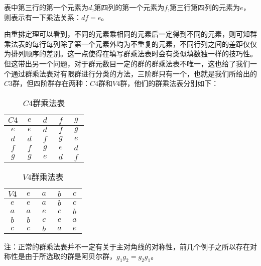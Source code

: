 表中第三行的第一个元素为$d$,第四列的第一个元素为$f$,第三行第四列的元素为$e$，则表示有一下乘法关系：$df=e$。

由重排定理可以看到，不同的元素乘相同的元素后一定得到不同的元素，则可知群乘法表的每行每列除了第一个元素外均为不重复的元素，不同行列之间的差距仅仅为排列顺序的差别。这一点使得在填写群乘法表时会有类似填数独一样的技巧性。但这带出另一个问题，对于群元数目一定的群的群乘法表不唯一，这也给了我们一个通过群乘法表对有限群进行分类的方法，三阶群只有一个，也就是我们所给出的$C3$群，但四阶群存在两种：$C4$群和$V4$群，他们的群乘法表分别如下：

\begin{table}[ht]
\centering
\caption{$C4$群乘法表}\label{groupt_tab2}
\begin{tabular}{|c|c|c|c|c|}
\hline
$C4$ & $~e~$ & $~d~$ & $~f~$ & $~g~$ \\
\hline
$e$ & $e$ & $d$ & $f$ & $g$ \\
\hline
$d$ & $d$ & $f$ & $g$ & $e$ \\
\hline
$f$ & $f$ & $g$ & $e$ & $d$ \\
\hline
$g$ & $g$ & $e$ & $d$ & $f$ \\
\hline
\end{tabular}
\end{table}

\begin{table}[ht]
\centering
\caption{$V4$群乘法表}\label{groupt_tab3}
\begin{tabular}{|c|c|c|c|c|}
\hline
$V4$ & $~e~$ & $~a~$ & $~b~$ & $~c~$ \\
\hline
$e$ & $e$ & $a$ & $b$ & $c$ \\
\hline
$a$ & $a$ & $e$ & $c$ & $b$ \\
\hline
$b$ & $b$ & $c$ & $e$ & $a$ \\
\hline
$c$ & $c$ & $b$ & $a$ & $e$ \\
\hline
\end{tabular}
\end{table}

注：正常的群乘法表并不一定有关于主对角线的对称性，前几个例子之所以存在对称性是由于所选取的群是阿贝尔群，$g_1g_2=g_2g_1$。

